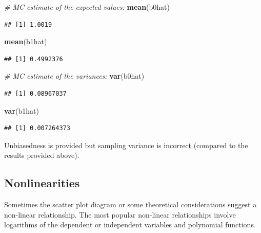 \documentclass[]{book}
\newenvironment{Shaded}{\begin{snugshade}}{\end{snugshade}}
\newcommand{\CommentTok}[1]{\textcolor[rgb]{0.56,0.35,0.01}{\textit{#1}}}
\newcommand{\KeywordTok}[1]{\textcolor[rgb]{0.13,0.29,0.53}{\textbf{#1}}}
\newcommand{\NormalTok}[1]{#1}
\begin{document}
\begin{Shaded}
\begin{Highlighting}[]
\CommentTok{# MC estimate of the expected values:}
\KeywordTok{mean}\NormalTok{(b0hat)}
\end{Highlighting}
\end{Shaded}

\begin{verbatim}
## [1] 1.0019
\end{verbatim}

\begin{Shaded}
\begin{Highlighting}[]
\KeywordTok{mean}\NormalTok{(b1hat)}
\end{Highlighting}
\end{Shaded}

\begin{verbatim}
## [1] 0.4992376
\end{verbatim}

\begin{Shaded}
\begin{Highlighting}[]
\CommentTok{# MC estimate of the variances:}
\KeywordTok{var}\NormalTok{(b0hat)}
\end{Highlighting}
\end{Shaded}

\begin{verbatim}
## [1] 0.08967037
\end{verbatim}

\begin{Shaded}
\begin{Highlighting}[]
\KeywordTok{var}\NormalTok{(b1hat)}
\end{Highlighting}
\end{Shaded}

\begin{verbatim}
## [1] 0.007264373
\end{verbatim}

Unbiasedness is provided but sampling variance is incorrect (compared to
the results provided above).

\hypertarget{nonlinearities}{%
\subsection{Nonlinearities}\label{nonlinearities}}

Sometimes the scatter plot diagram or some theoretical considerations
suggest a non-linear relationship. The most popular non-linear
relationships involve logarithms of the dependent or independent
variables and polynomial functions.
\end{document}

